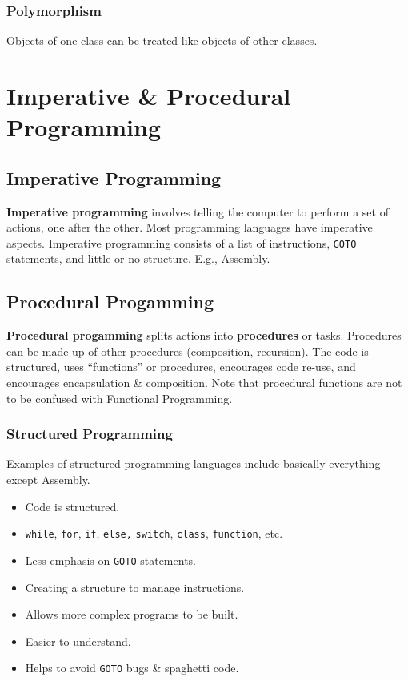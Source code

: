 \documentclass[a4paper,11pt]{article}
\begin{document}
\subsubsection{Polymorphism}
Objects of one class can be treated like objects of other classes.

\section{Imperative \& Procedural Programming}
\subsection{Imperative Programming}
\textbf{Imperative programming} involves telling the computer to perform a set of actions, one after the other. 
Most programming languages have imperative aspects.
Imperative programming consists of a list of instructions, \verb|GOTO| statements, and little or no structure.
E.g., Assembly.

\subsection{Procedural Progamming}
\textbf{Procedural progamming} splits actions into \textbf{procedures} or tasks. 
Procedures can be made up of other procedures (composition, recursion). 
The code is structured, uses ``functions'' or procedures, encourages code re-use, and encourages encapsulation \&
composition.
Note that procedural functions are not to be confused with Functional Programming.

\subsubsection{Structured Programming}
Examples of structured programming languages include basically everything except Assembly.
\begin{itemize}
    \item   Code is structured.
    \item   \verb|while|, \verb|for|, \verb|if|, \verb|else,| \verb|switch|, \verb|class|, \verb|function|, etc.
    \item   Less emphasis on \verb|GOTO| statements.
    \item   Creating a structure to manage instructions.
    \item   Allows more complex programs to be built.
    \item   Easier to understand.
    \item   Helps to avoid \verb|GOTO| bugs \& spaghetti code.
\end{itemize}
\end{document}
